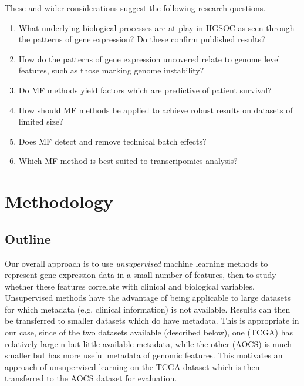 \documentclass[tikz, 11pt,a4paper,oneside,fleqn]{article}
\begin{document}
These and wider considerations suggest the following research questions.

\begin{enumerate}
\item What underlying biological processes are at play in HGSOC as seen through the patterns of gene expression?  Do these confirm published results?
\item How do the patterns of gene expression uncovered relate to genome level features, such as those marking genome instability?
\item Do MF methods yield factors which are predictive of patient survival?
\item How should MF methods be applied to achieve robust results on datasets of limited size?
\item Does MF detect and remove technical batch effects?
\item Which MF method is best suited to transcripomics analysis?
\end{enumerate}



\section{Methodology}

\subsection{Outline}

Our overall approach is to use \emph{unsupervised} machine learning methods to represent gene expression data in a small number of features, then to study whether these features correlate with clinical and biological variables.  Unsupervised methods have the advantage of being applicable to large datasets for which metadata (e.g. clinical information) is not available.  Results can then be transferred to smaller datasets which do have metadata.   This is appropriate in our case, since of the two datasets available (described below), one (TCGA) has relatively large n but little available metadata, while the other (AOCS) is much smaller but has more useful metadata of genomic features.   This motivates an approach of unsupervised learning on the TCGA dataset which is then transferred to the AOCS dataset for evaluation.
\end{document}
